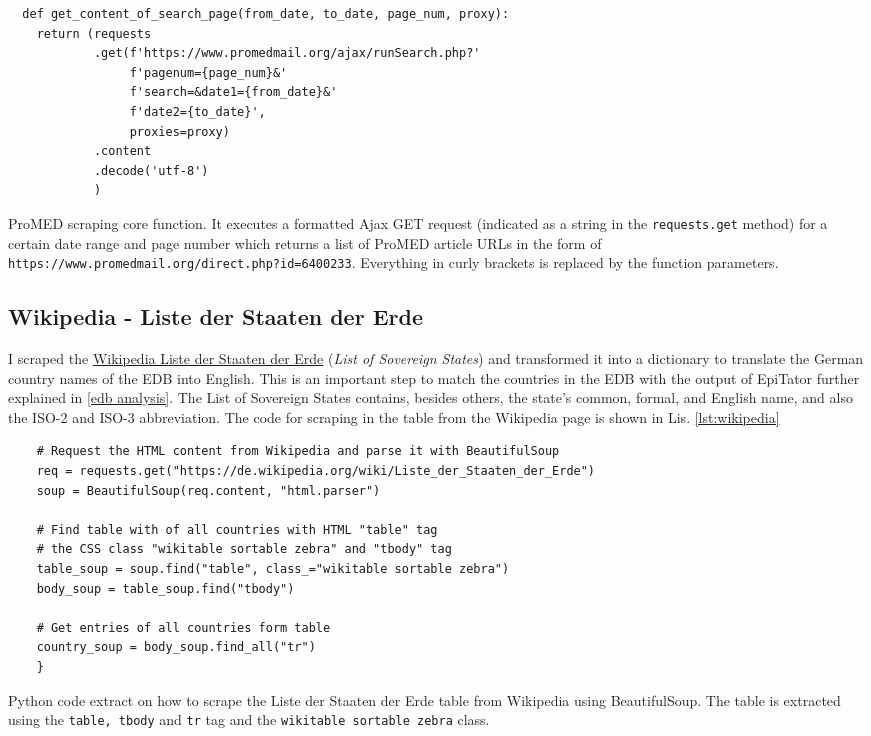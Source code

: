 \begin{listing}[h!]
  \begin{verbatim}
  def get_content_of_search_page(from_date, to_date, page_num, proxy):
    return (requests
            .get(f'https://www.promedmail.org/ajax/runSearch.php?'
                 f'pagenum={page_num}&'
                 f'search=&date1={from_date}&'
                 f'date2={to_date}',
                 proxies=proxy)
            .content
            .decode('utf-8')
            )
  \end{verbatim}
  \caption{ProMED scraping core function. It executes a formatted Ajax GET request (indicated as a string in the \texttt{requests.get} method) for a certain date range and page number which returns a list of ProMED article URLs in the form of \textquotesingle \texttt{https://www.promedmail.org/direct.php?id=6400233}\textquotesingle. Everything in curly brackets is replaced by the function parameters.}
  \label{lst:promed}
\end{listing}

\subsection{Wikipedia - Liste der Staaten der Erde}\label{wikipedia}
I scraped the \href{https://de.wikipedia.org/wiki/Liste_der_Staaten_der_Erde}{Wikipedia Liste der Staaten der Erde} (\textit{List of Sovereign States}) and transformed it into a dictionary to translate the German country names of the EDB into English. This is an important step to match the countries in the EDB with the output of EpiTator further explained in \ref{edb analysis}. The List of Sovereign States contains, besides others, the state's common, formal, and English name, and also the ISO-2 and ISO-3 abbreviation.
The code for scraping in the table from the Wikipedia page is shown in Lis. \ref{lst:wikipedia}

\begin{listing}[h]
  \begin{verbatim}
    # Request the HTML content from Wikipedia and parse it with BeautifulSoup
    req = requests.get("https://de.wikipedia.org/wiki/Liste_der_Staaten_der_Erde")
    soup = BeautifulSoup(req.content, "html.parser")

    # Find table with of all countries with HTML "table" tag
    # the CSS class "wikitable sortable zebra" and "tbody" tag
    table_soup = soup.find("table", class_="wikitable sortable zebra")
    body_soup = table_soup.find("tbody")

    # Get entries of all countries form table
    country_soup = body_soup.find_all("tr")
    }
  \end{verbatim}
  \caption{Python code extract on how to scrape the Liste der Staaten der Erde table from Wikipedia using BeautifulSoup. The table is extracted using the \texttt{table, tbody} and \texttt{tr} tag and the \texttt{wikitable sortable zebra} class.}
  \label{lst:wikipedia}
\end{listing}

